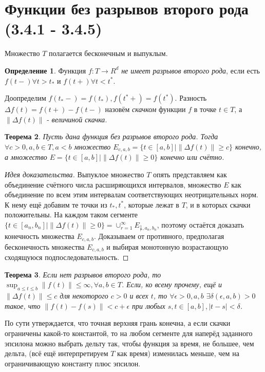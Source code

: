 \documentclass[16pt]{article}
\newtheorem{theorem}{Теорема}[section]
\theoremstyle{definition}
\newtheorem{definition}[theorem]{Определение}
\begin{document}
\section{Функции без разрывов второго рода (3.4.1 - 3.4.5)}
Множество $T$ полагается бесконечным и выпуклым.
\begin{definition}
Функция $f: T \rightarrow R^d$ \textit{не имеет разрывов второго рода}, если есть $f(t-) \forall t > t_*$ и $f(t+) \forall t < t^*$.
\end{definition}
Доопределим $f(t_*-) = f(t_*), f(t^*+)=f(t^*)$. Разность $\Delta f(t) = f(t+) - f(t-)$ назовём \textit{скачком} функции $f$ в точке $t \in T$, а $\|\Delta f(t)\|$ - \textit{величиной скачка}.
\begin{theorem}
Пусть дана функция без разрывов второго рода. Тогда $\forall c > 0, a, b \in T, a < b$ множество $E_{c, a, b} = \{t \in [a, b] \mid \|\Delta f(t)\| \ge c\}$ конечно, а множество $E = \{t \in [a, b] \mid \|\Delta f(t)\| \ge 0\}$ конечно или счётно.
\end{theorem}
\begin{proof}[Идея доказательства]
Выпуклое множество $T$ опять представляем как объединение счётного числа расширяющихся интервалов, множество $E$ как объединение по всем этим интервалам соответствующих неотрицательных норм. К нему ещё добавим те точки из $t_*, t^*$, которые лежат в $T$, и в которых скачки положительны. На каждом таком сегменте $\{t \in [a_n, b_n] \mid \|\Delta f(t)\| \ge 0\} = \cup_{r = 1}^\infty E_{\frac{1}{r}, a_n, b_n}$, поэтому остаётся доказать конечность множества $E_{c, a, b}$. Доказываем от противного, предполагая бесконечность множества $E_{c, a, b}$ и выбирая монотонную возрастающую сходящуюся подпоследовательность.
\end{proof}
\begin{theorem}
Если нет разрывов второго рода, то $\sup_{a \le t \le b} \|f(t)\| \le \infty, \forall a, b \in T$. Если, ко всему прочему, ещё и $\|\Delta f(t)\| \le c$ для некоторого $c > 0$ и всех $t$, то $\forall \epsilon > 0, a, b$ $\exists \delta(\epsilon, a, b) > 0$ такое, что $\|f(t) - f(s)\| < c + \epsilon$ при любых $s, t \in [a, b], |t - s| < \delta$.
\end{theorem}
По сути утверждается, что точная верхняя грань конечна, а если скачки ограничены какой-то константой, то на любом сегменте для наперёд заданного эпсилона можно выбрать дельту так, чтобы функция за время, не большее, чем дельта, (всё ещё интерпретируем $T$ как время) изменилась меньше, чем на ограничивающую константу плюс эпсилон.
\end{document}
